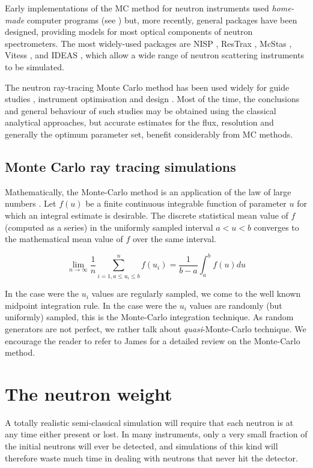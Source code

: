 Early implementations of the MC method for neutron instruments used \emph{home-made} computer programs  (see \cite{Copley86,Mildner77}) but, more recently, general packages have been designed, providing models for most optical components of neutron spectrometers.
The most widely-used packages are NISP \cite{NISP}, ResTrax \cite{Restrax}, McStas \cite{nn_10_20,mcstas_webpage}, Vitess \cite{Vitess}, and IDEAS \cite{IDEAS}, which allow a wide range of neutron scattering instruments to be simulated.

The neutron ray-tracing Monte Carlo method has been used widely for guide studies \cite{Copley93,Farhi02,Schanzer04}, instrument optimisation and design \cite{Zsigmond04,Lieutenant05}. Most of the time, the conclusions and general behaviour of such studies may be obtained using the classical analytical approaches, but accurate estimates for the flux, resolution and generally the optimum parameter set, benefit considerably from MC methods.

\subsection{Monte Carlo ray tracing simulations}
Mathematically, the Monte-Carlo method is an application of the law of large numbers \cite{James80,Grimmett92}. Let $f(u)$ be a finite continuous integrable function of parameter $u$ for which an integral estimate is desirable. The discrete statistical mean value of $f$ (computed as a series) in the uniformly sampled interval $a < u < b$ converges to the mathematical mean value of $f$ over the same interval.

\begin{equation}
\lim_{n \rightarrow \infty} \frac{1}{n} \sum_{i=1, a \leq u_i \leq b}^n f(u_i) = \frac{1}{b-a}\int_a^b f(u) du
\end{equation}

In the case were the $u_i$ values are regularly sampled, we come to the well known midpoint integration rule. In the case were the $u_i$ values are randomly (but uniformly) sampled, this is the Monte-Carlo integration technique. As random generators are not perfect, we rather talk about \emph{quasi}-Monte-Carlo technique. We encourage the reader to refer to James \cite{James80} for a detailed review on the Monte-Carlo method.

\section{The neutron weight}
\label{s:probweight}
A totally realistic semi-classical simulation will require that
each neutron is at any time either present or lost.
In many instruments, only a very
small fraction of the initial neutrons will ever be detected, and
simulations of this kind will therefore waste much time in dealing
with neutrons that never hit the detector.

